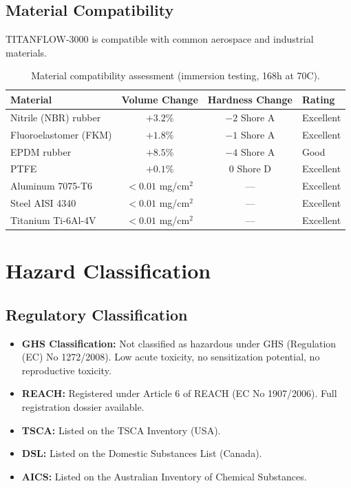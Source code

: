 \documentclass[
    language=english,
    doctype=data-sheet,
    institution=none,
]{../../omnilatex}
\begin{document}
\subsection{Material Compatibility}

TITANFLOW-3000 is compatible with common aerospace and industrial materials.

\begin{table}[htbp]
    \centering
    \caption{Material compatibility assessment (immersion testing, 168h at 70\degree C).}
    \label{tab:compatibility}
    \begin{tabular}{@{}lccl@{}}
        \toprule
        Material & Volume Change & Hardness Change & Rating \\
        \midrule
        Nitrile (NBR) rubber & $+3.2$\% & $-2$ Shore A & Excellent \\
        Fluoroelastomer (FKM) & $+1.8$\% & $-1$ Shore A & Excellent \\
        EPDM rubber & $+8.5$\% & $-4$ Shore A & Good \\
        PTFE & $+0.1$\% & $0$ Shore D & Excellent \\
        Aluminum 7075-T6 & $< 0.01$ mg/cm$^2$ & --- & Excellent \\
        Steel AISI 4340 & $< 0.01$ mg/cm$^2$ & --- & Excellent \\
        Titanium Ti-6Al-4V & $< 0.01$ mg/cm$^2$ & --- & Excellent \\
        \bottomrule
    \end{tabular}
\end{table}

\section{Hazard Classification}
\label{sec:hazards}

\subsection{Regulatory Classification}

\begin{itemize}
    \item \textbf{GHS Classification:} Not classified as hazardous under
          GHS (Regulation (EC) No 1272/2008). Low acute toxicity, no
          sensitization potential, no reproductive toxicity.
    \item \textbf{REACH:} Registered under Article 6 of REACH (EC No
          1907/2006). Full registration dossier available.
    \item \textbf{TSCA:} Listed on the TSCA Inventory (USA).
    \item \textbf{DSL:} Listed on the Domestic Substances List (Canada).
    \item \textbf{AICS:} Listed on the Australian Inventory of Chemical
          Substances.
\end{itemize}
\end{document}
